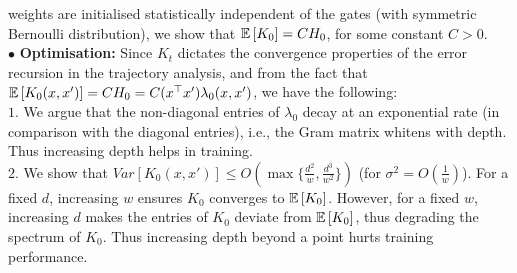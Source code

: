 \documentclass{article}
\begin{document}
weights are initialised statistically independent of the gates (with symmetric Bernoulli distribution), we show that $\mathbb{E}\left[K_0\right]=C H_0$, for some constant $C>0$. \hfill\\
$\bullet$ \textbf{Optimisation:} Since $K_t$ dictates the convergence properties of the error recursion in the trajectory analysis, and from the fact that $\mathbb{E}\left[K_0(x,x')\right]=C H_0=C (x^\top x')\lambda_0(x,x')$, we have the following: \hfill\\
$1.$ We argue that the non-diagonal entries of $\lambda_0$ decay at an exponential rate (in comparison with the diagonal entries), i.e., the Gram matrix whitens with depth. Thus increasing depth helps in training. \hfill\\
$2.$ We show that $Var\left[K_0(x,x')\right]\leq O(\max\{\frac{d^2}{w}, \frac{d^3}{w^2}\})$ (for $\sigma^2=O(\frac{1}w)$). For a fixed $d$, increasing $w$ ensures $K_0$ converges to $\mathbb{E}\left[K_0\right]$. However, for a fixed $w$, increasing $d$ makes the entries of $K_0$ deviate from $\mathbb{E}\left[K_0\right]$, thus degrading the spectrum of $K_0$. Thus increasing depth beyond a point hurts training performance. \hfill\\
\end{document}
